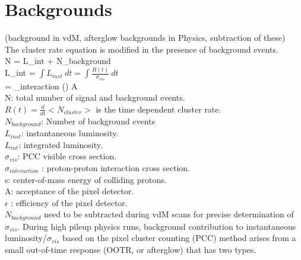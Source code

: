 \section{Backgrounds}
\label{sec:bkg}
(background in vdM, afterglow backgrounds in Physics, subtraction of these) \\

The cluster rate equation is modified in the presence of background events. \\

N = \sigma \:L_{int} + N_{background} \\

L_{int} = $ \int L_{inst} \: dt = \int \frac{R(t)}{\sigma_{vis}} \:dt $  \\

\sigma = \sigma_{interaction} () \: A \:\epsilon\\

N: total number of signal and background events. \\

$R(t) = \frac{d}{dt} <N_{cluster}>$ is the time dependent cluster rate. \\

$N_{background}$: Number of background events \\

$L_{inst}$: instantaneous luminosity.\\

$L_{int}$: integrated luminosity. \\

$\sigma_{vis}$: PCC visible cross section.\\

$\sigma_{interaction}$ : proton-proton interaction cross section. \\

s: center-of-mass energy of colliding protons. \\

A: acceptance of the pixel detector. \\

$\epsilon$ : efficiency of the pixel detector. \\

$N_{background}$ need to be subtracted during vdM scans for precise determination of $\sigma_{vis}$. During high pileup physics runs, background contribution to instantaneous luminosity/$\sigma_{vis}$ based on the pixel cluster counting (PCC) method arises from a small out-of-time response (OOTR, or afterglow) that has two types.\\


